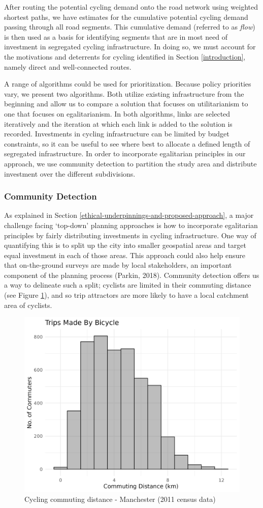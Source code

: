 \documentclass[
]{article}
\begin{document}
After routing the potential cycling demand onto the road network using weighted shortest paths, we have estimates for the cumulative potential cycling demand passing through all road segments.
This cumulative demand (referred to as \emph{flow}) is then used as a basis for identifying segments that are in most need of investment in segregated cycling infrastructure.
In doing so, we must account for the motivations and deterrents for cycling identified in Section \ref{introduction}, namely direct and well-connected routes.

A range of algorithms could be used for prioritization.
Because policy priorities vary, we present two algorithms.
Both utilize existing infrastructure from the beginning and allow us to compare a solution that focuses on utilitarianism to one that focuses on egalitarianism.
In both algorithms, links are selected iteratively and the iteration at which each link is added to the solution is recorded.
Investments in cycling infrastructure can be limited by budget constraints, so it can be useful to see where best to allocate a defined length of segregated infrastructure.
In order to incorporate egalitarian principles in our approach, we use community detection to partition the study area and distribute investment over the different subdivisions.

\hypertarget{community-detection}{%
\subsubsection{Community Detection}\label{community-detection}}

As explained in Section \ref{ethical-underpinnings-and-proposed-approach}, a major challenge facing `top-down' planning approaches is how to incorporate egalitarian principles by fairly distributing investments in cycling infrastructure.
One way of quantifying this is to split up the city into smaller geospatial areas and target equal investment in each of those areas.
This approach could also help ensure that on-the-ground surveys are made by local stakeholders, an important component of the planning process (Parkin, 2018).
Community detection offers us a way to delineate such a split; cyclists are limited in their commuting distance (see Figure \ref{fig:cyclinghistmanc}), and so trip attractors are more likely to have a local catchment area of cyclists.

\begin{figure}

{\centering \includegraphics[width=0.4\linewidth]{data/Manchester/Plots/histogram_distance_cycling} 

}

\caption{Cycling commuting distance - Manchester (2011 census data)}\label{fig:cyclinghistmanc}
\end{figure}
\end{document}
